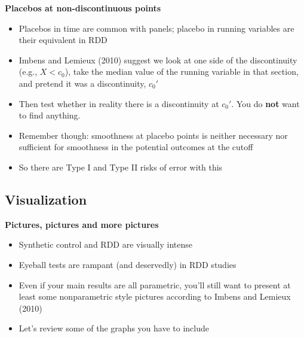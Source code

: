 \documentclass[notes=show]{beamer}
\begin{document}
\begin{frame}[plain]
	\begin{center}
	\textbf{Placebos at non-discontinuous points}
	\end{center}
	
	\begin{itemize}
	\item Placebos in time are common with panels; placebo in running variables are their equivalent in RDD
	\item Imbens and Lemieux (2010) suggest we look at one side of the discontinuity (e.g., $X<c_0$), take the median value of the running variable in that section, and pretend it was a discontinuity, $c_0'$
	\item Then test whether in reality there is a discontinuity at $c_0'$.   You do \textbf{not} want to find anything.
	\item Remember though: smoothness at placebo points is neither necessary nor sufficient for smoothness in the potential outcomes at the cutoff
	\item So there are Type I and Type II risks of error with this
	\end{itemize}
\end{frame}

\subsection{Visualization}


\begin{frame}

\begin{center}
\textbf{Pictures, pictures and more pictures}
\end{center}

\begin{itemize}
\item Synthetic control and RDD are visually intense
\item Eyeball tests are rampant (and deservedly) in RDD studies
\item Even if your main results are all parametric, you'll still want to present at least some nonparametric style pictures according to Imbens and Lemieux (2010)
\item Let's review some of the graphs you have to include 
\end{itemize}

\end{frame}	
\end{document}
